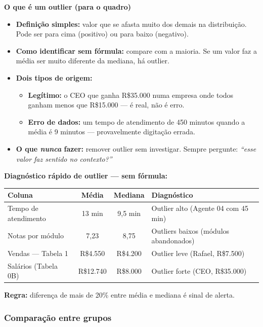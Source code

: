 \begin{BoardBox}
\textbf{O que é um outlier (para o quadro)}
\begin{itemize}
  \item \textbf{Definição simples:} valor que se afasta muito dos demais
  na distribuição. Pode ser para cima (positivo) ou para baixo (negativo).
  \item \textbf{Como identificar sem fórmula:} compare com a maioria.
  Se um valor faz a média ser muito diferente da mediana, há outlier.
  \item \textbf{Dois tipos de origem:}
  \begin{itemize}
    \item \textbf{Legítimo:} o CEO que ganha R\$35.000 numa empresa onde\break
    todos ganham menos que R\$15.000 — é real, não é erro.
    \item \textbf{Erro de dados:} um tempo de atendimento de 450 minutos\break
    quando a média é 9 minutos — provavelmente digitação errada.
  \end{itemize}
  \item \textbf{O que \emph{nunca} fazer:} remover outlier sem investigar.\break
  Sempre pergunte: \emph{``esse valor faz sentido no contexto?''}
\end{itemize}
\end{BoardBox}

\begin{SolvedBox}
\textbf{Diagnóstico rápido de outlier — sem fórmula:}
\begin{center}
\begin{tabular}{|l|c|c|l|}
\hline
\textbf{Coluna} & \textbf{Média} & \textbf{Mediana} & \textbf{Diagnóstico} \\
\hline
Tempo de atendimento & 13 min & 9,5 min & Outlier alto (Agente 04 com 45 min) \\
Notas por módulo & 7,23 & 8,75 & Outliers baixos (módulos abandonados) \\
Vendas — Tabela 1 & R\$4.550 & R\$4.200 & Outlier leve (Rafael, R\$7.500) \\
Salários (Tabela 0B) & R\$12.740 & R\$8.000 & Outlier forte (CEO, R\$35.000) \\
\hline
\end{tabular}
\end{center}
\textbf{Regra:} diferença de mais de 20\% entre média e mediana é sinal de alerta.
\end{SolvedBox}

\subsubsection*{Comparação entre grupos}

